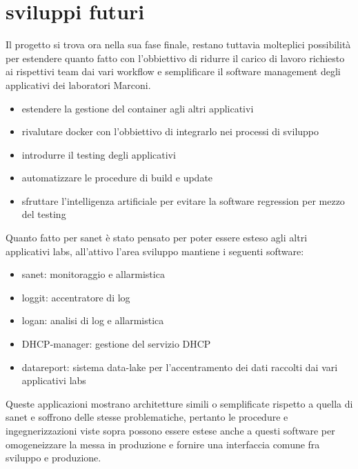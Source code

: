 \chapter{sviluppi futuri}

Il progetto si trova ora nella sua fase finale, restano tuttavia molteplici possibilità per estendere quanto fatto con l'obbiettivo di ridurre il carico di lavoro richiesto ai rispettivi team dai vari workflow e semplificare il software management degli applicativi dei laboratori Marconi.

\begin{itemize}
  \item{estendere la gestione del container agli altri applicativi}
  \item{rivalutare docker con l'obbiettivo di integrarlo nei processi di sviluppo}
  \item{introdurre il testing degli applicativi}
  \item{automatizzare le procedure di build e update}
  \item{sfruttare l'intelligenza artificiale per evitare la software regression per mezzo del testing}
\end{itemize}

Quanto fatto per sanet è stato pensato per poter essere esteso agli altri applicativi labs, all'attivo l'area sviluppo mantiene i seguenti software:

\begin{itemize}
  \item{sanet: monitoraggio e allarmistica}
  \item{loggit: accentratore di log}
  \item{logan: analisi di log e allarmistica}
  \item{DHCP-manager: gestione del servizio DHCP}
  \item{datareport: sistema data-lake per l'accentramento dei dati raccolti dai vari applicativi labs}
\end{itemize}

Queste applicazioni mostrano architetture simili o semplificate rispetto a quella di sanet e soffrono delle stesse problematiche, pertanto le procedure e ingegnerizzazioni viste sopra possono essere estese anche a questi software per omogeneizzare la messa in produzione e fornire una interfaccia comune fra sviluppo e produzione.

